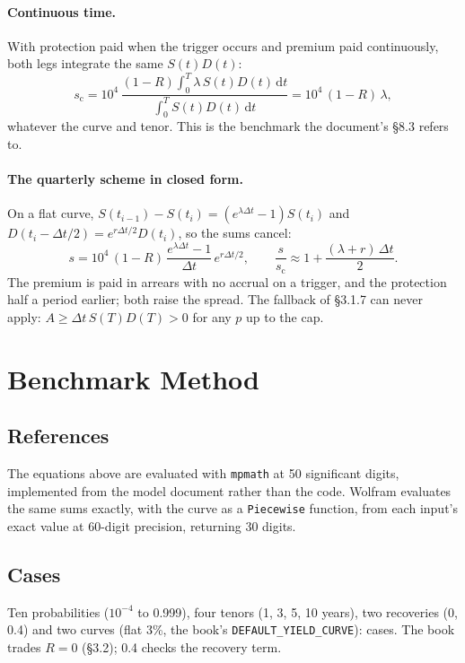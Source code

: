 \documentclass[11pt,a4paper]{article}
\begin{document}
\paragraph{Continuous time.} With protection paid when the trigger occurs and
premium paid continuously, both legs integrate the same $S(t)D(t)$:
\begin{equation}
s_{\mathrm{c}}=10^4\,\frac{(1-R)\int_0^T\lambda\,S(t)D(t)\,\mathrm{d}t}{\int_0^T S(t)D(t)\,\mathrm{d}t}
=10^4\,(1-R)\,\lambda,
\end{equation}
whatever the curve and tenor. This is the benchmark the document's \S8.3 refers to.

\paragraph{The quarterly scheme in closed form.} On a flat curve,
$S(t_{i-1})-S(t_i)=(e^{\lambda\Delta t}-1)S(t_i)$ and
$D(t_i-\Delta t/2)=e^{r\Delta t/2}D(t_i)$, so the sums cancel:
\begin{equation}
s=10^4\,(1-R)\,\frac{e^{\lambda\Delta t}-1}{\Delta t}\,e^{r\Delta t/2},
\qquad\frac{s}{s_{\mathrm{c}}}\approx1+\frac{(\lambda+r)\,\Delta t}{2}.
\end{equation}
The premium is paid in arrears with no accrual on a trigger, and the protection
half a period earlier; both raise the spread. The fallback of \S3.1.7 can never
apply: $A\ge\Delta t\,S(T)D(T)>0$ for any $p$ up to the cap.

\section{Benchmark Method}

\subsection{References}
The equations above are evaluated with \texttt{mpmath} at 50 significant digits,
implemented from the model document rather than the code. Wolfram evaluates the
same sums exactly, with the curve as a \texttt{Piecewise} function, from each
input's exact value at 60-digit precision, returning 30 digits.

\subsection{Cases}
Ten probabilities ($10^{-4}$ to 0.999), four tenors (1, 3, 5, 10 years), two
recoveries (0, 0.4) and two curves (flat 3\%, the book's
\texttt{DEFAULT\_YIELD\_CURVE}): \bmCases{} cases. The book trades $R=0$
(\S3.2); 0.4 checks the recovery term.
\end{document}
